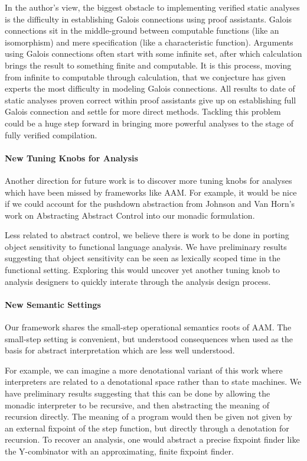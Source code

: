 \documentclass{article}
\begin{document}
In the author's view, the biggest obstacle to implementing verified static analyses is 
  the difficulty in establishing Galois connections using proof assistants.
Galois connections sit in the middle-ground between computable functions (like an isomorphism) 
  and mere specification (like a characteristic function).
Arguments using Galois connections often start with some infinite set, after which calculation brings the 
  result to something finite and computable.
It is this process, moving from infinite to computable through calculation, that we conjecture has given experts the most difficulty in modeling Galois connections.
All results to date of static analyses proven correct within proof assistants give up on establishing full Galois connection 
  and settle for more direct methods.
Tackling this problem could be a huge step forward in bringing more powerful analyses to the stage of fully verified compilation.

\paragraph{New Tuning Knobs for Analysis}
Another direction for future work is to discover more tuning knobs for analyses which have been missed by frameworks like AAM.
For example, it would be nice if we could account for the pushdown abstraction 
  from Johnson and Van Horn's work on Abstracting Abstract Control into our monadic formulation.

Less related to abstract control, we believe there is work to be done in porting object sensitivity to functional language analysis.
We have preliminary results suggesting that object sensitivity can be seen as lexically scoped time in the functional setting.
Exploring this would uncover yet another tuning knob to analysis designers to quickly interate through the analysis design process.

\paragraph{New Semantic Settings}
Our framework shares the small-step operational semantics roots of AAM.
The small-step setting is convenient, but understood consequences when used as the basis for abstract interpretation 
  which are less well understood.

For example, we can imagine a more denotational variant of this work where interpreters are related to a denotational space 
  rather than to state machines.
We have preliminary results suggesting that this can be done by allowing the monadic interpreter to be recursive, 
  and then abstracting the meaning of recursion directly.
The meaning of a program would then be given not given by an external fixpoint of the step function, 
  but directly through a denotation for recursion.
To recover an analysis, one would abstract a precise fixpoint finder like the Y-combinator with an approximating, finite fixpoint finder.
\end{document}
